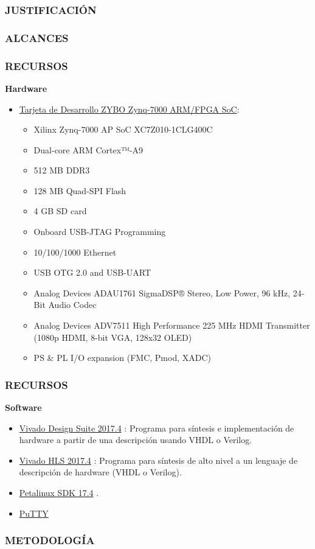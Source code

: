 \documentclass{beamer}
\begin{document}
\begin{frame}
\frametitle{JUSTIFICACIÓN}

\end{frame}

\begin{frame}
\frametitle{ALCANCES}

\end{frame}
\begin{frame}
\frametitle{RECURSOS}
\textbf{Hardware}
\begin{itemize}
\item \href{https://store.digilentinc.com/zybo-zynq-7000-arm-fpga-soc-trainer-board/}{Tarjeta de Desarrollo ZYBO Zynq-7000 ARM/FPGA SoC}:
  \begin{itemize}
  \item Xilinx Zynq-7000 AP SoC XC7Z010-1CLG400C
  \item Dual-core ARM Cortex™-A9 
  \item 512 MB DDR3 
  \item 128 MB Quad-SPI Flash 
  \item 4 GB SD card 
  \item Onboard USB-JTAG Programming
  \item 10/100/1000 Ethernet 
  \item USB OTG 2.0 and USB-UART 
  \item Analog Devices ADAU1761 SigmaDSP® Stereo, Low Power, 96 kHz, 24-Bit Audio Codec
  \item Analog Devices ADV7511 High Performance 225 MHz HDMI Transmitter (1080p HDMI, 8-bit VGA, 128x32 OLED)
  \item PS \& PL I/O expansion (FMC, Pmod, XADC) 
  \end{itemize}
\end{itemize}
\end{frame}
\begin{frame}
\frametitle{RECURSOS}
    \textbf{Software}
    \begin{itemize}
    \item \href{http://www.xilinx.com/products/design-tools/vivado.html}{Vivado Design Suite 2017.4} \citep{Vivad98}: Programa para síntesis e implementación de hardware a partir de una descripción usando VHDL o Verilog.
    \item \href{http://www.xilinx.com/products/design-tools/vivado/integration/esl-design.html}{Vivado HLS 2017.4} \citep{Vivad77}: Programa para síntesis de alto nivel a un lenguaje de descripción de hardware (VHDL o Verilog).
    \item \href{http://www.xilinx.com/products/design-tools/embedded-software/petalinux-sdk.html}{Petalinux SDK 17.4} \citep{PetaL29}.
    \item \href{http://www.putty.org}{PuTTY}
    \end{itemize}
\end{frame}
\begin{frame}
\frametitle{METODOLOGÍA}

\end{frame}
\end{document}

